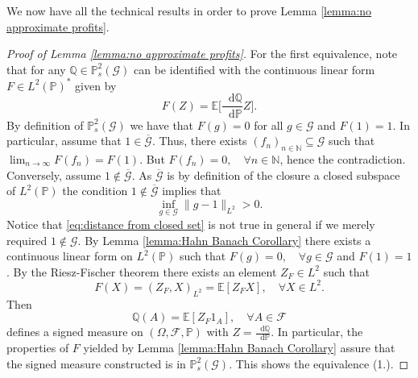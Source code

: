\documentclass[11pt,a4paper,twoside,openany]{report}
\numberwithin{equation}{section}
\newcommand{\diff}{\mathop{}\!\mathrm{d}}
\theoremstyle{plain} %
\theoremstyle{definition} %
\theoremstyle{remark} %
\begin{document}
We now have all the technical results in order to prove Lemma \ref{lemma:no approximate profits}.
\begin{proof}[Proof of Lemma \ref{lemma:no approximate profits}]
For the first equivalence, note that for any \(\mathbb{Q}\in\mathbb{P}_s^2(\mathcal{G})\) can be identified with the continuous linear form \(F\in L^2(\mathbb{P})^*\) given by 
\begin{equation*}
    F(Z)=\mathbb{E}\bigg[\frac{\diff\mathbb{Q}}{\diff\mathbb{P}}Z\bigg].
\end{equation*}
By definition of \(\mathbb{P}_s^2(\mathcal{G})\) we have that \(F(g)=0\) for all \(g\in\mathcal{G}\) and \(F(1)=1\). In particular,  assume that \(1\in\overline{\mathcal{G}}\). Thus, there exists \((f_n)_{n\in\mathbb{N}}\subseteq\mathcal{G}\) such that \(\lim_{n\to\infty}F(f_n)=F(1)\). But \(F(f_n)=0,\quad\forall n\in\mathbb{N}\), hence the contradiction. Conversely, assume \(1\notin\overline{\mathcal{G}}\). As \(\overline{\mathcal{G}}\) is by definition of the closure a closed subspace of \(L^2(\mathbb{P})\) the condition
\(1\notin\overline{\mathcal{G}}\) implies that 
\begin{equation}\label{eq:distance from closed set}
    \inf_{g\in\mathcal{G}}\lVert g-1\rVert_{L^2}>0.
\end{equation}
Notice that \eqref{eq:distance from closed set} is not true in general if we merely required \(1\notin\mathcal{G}\).
By Lemma \ref{lemma:Hahn Banach Corollary} there exists a continuous linear form on \(L^2(\mathbb{P})\) such that \(F(g)=0,\quad\forall g\in\mathcal{G}\) and  \(F(1)=1\). By the Riesz-Fischer theorem there exists an element \(Z_F\in L^2\) such that
\begin{equation*}
    F(X)=(Z_F,X)_{L^2}=\mathbb{E}[Z_FX],\quad\forall X\in L^2.
\end{equation*}
Then 
\begin{equation*}
    \mathbb{Q}(A)=\mathbb{E}[Z_F1_A],\quad\forall A\in\mathcal{F}
\end{equation*}
defines a signed measure on \((\Omega,\mathcal{F},\mathbb{P})\) with \(Z=\frac{\diff \mathbb{Q}}{\diff \mathbb{P}}\). In particular, the properties of \(F\) yielded by Lemma \ref{lemma:Hahn Banach Corollary} assure that the signed measure constructed is in  \(\mathbb{P}_s^2(\mathcal{G})\). This shows the equivalence (1.).


\end{proof}
\end{document}
